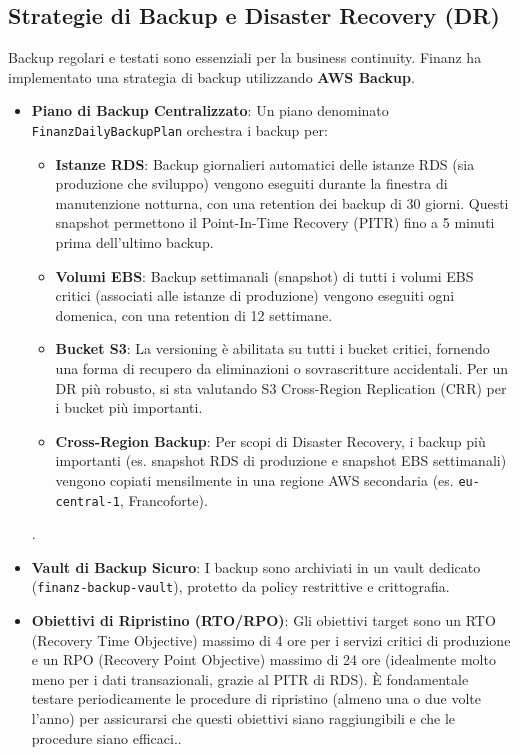 \subsection{Strategie di Backup e Disaster Recovery (DR)}
\label{subsec:backup-dr_cap2}
Backup regolari e testati sono essenziali per la business continuity. Finanz ha implementato una strategia di backup utilizzando \textbf{AWS Backup}.
\begin{itemize}
    \item \textbf{Piano di Backup Centralizzato}: Un piano denominato \texttt{FinanzDailyBackupPlan} orchestra i backup per: 
    \begin{itemize}
    \item \textbf{Istanze RDS}: Backup giornalieri automatici delle istanze RDS (sia produzione che sviluppo) vengono eseguiti durante la finestra di manutenzione notturna, con una retention dei backup di 30 giorni. Questi snapshot permettono il Point-In-Time Recovery (PITR) fino a 5 minuti prima dell'ultimo backup.
            \item \textbf{Volumi EBS}: Backup settimanali (snapshot) di tutti i volumi EBS critici (associati alle istanze di produzione) vengono eseguiti ogni domenica, con una retention di 12 settimane.
            \item \textbf{Bucket S3}: La versioning è abilitata su tutti i bucket critici, fornendo una forma di recupero da eliminazioni o sovrascritture accidentali. Per un DR più robusto, si sta valutando S3 Cross-Region Replication (CRR) per i bucket più importanti.
            \item \textbf{Cross-Region Backup}: Per scopi di Disaster Recovery, i backup più importanti (es. snapshot RDS di produzione e snapshot EBS settimanali) vengono copiati mensilmente in una regione AWS secondaria (es. \texttt{eu-central-1}, Francoforte).
        \end{itemize}.
    \item \textbf{Vault di Backup Sicuro}: I backup sono archiviati in un vault dedicato (\texttt{finanz-backup-vault}), protetto da policy restrittive e crittografia.
    \item \textbf{Obiettivi di Ripristino (RTO/RPO)}: Gli obiettivi target sono un RTO (Recovery Time Objective) massimo di 4 ore per i servizi critici di produzione e un RPO (Recovery Point Objective) massimo di 24 ore (idealmente molto meno per i dati transazionali, grazie al PITR di RDS). È fondamentale testare periodicamente le procedure di ripristino (almeno una o due volte l'anno) per assicurarsi che questi obiettivi siano raggiungibili e che le procedure siano efficaci..
\end{itemize}

